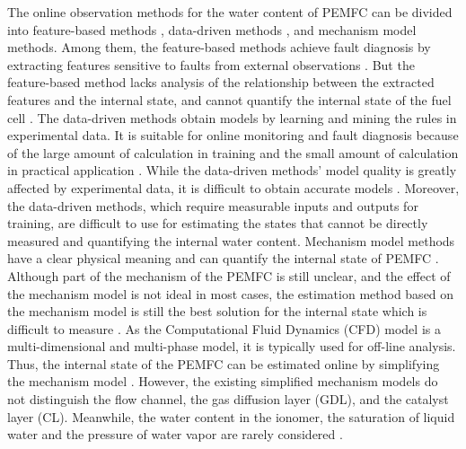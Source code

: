 The online observation methods for the water content of PEMFC can be divided into feature-based methods \cite{kimStateofhealthDiagnosisBased2012,maWaterContentDiagnosis2020,xuNonlinearObservationInternal2017}, data-driven methods \cite{zhangIntelligentSimultaneousFault2019,baoModelingControlAir2006,zhangUnscentedKalmanFilter2020}, and mechanism model methods\cite{linReviewHydrogenFuel2019,benmounaFaultDiagnosisMethods2017}. Among them, the feature-based methods achieve fault diagnosis by extracting features sensitive to faults from external observations \cite{zhangUnscentedKalmanFilter2020}. But the feature-based method lacks analysis of the relationship between the extracted features and the internal state, and cannot quantify the internal state of the fuel cell \cite{damourPolymerElectrolyteMembrane2015}. The data-driven methods obtain models by learning and mining the rules in experimental data. It is suitable for online monitoring and fault diagnosis because of the large amount of calculation in training and the small amount of calculation in practical application \cite{shinOnlineWaterContents2020,vichardHybridFuelCell2021,cooperElectricalTestMethods2006}. While the data-driven methods' model quality is greatly affected by experimental data, it is difficult to obtain accurate models \cite{benaggouneDatadrivenMethodMultistepahead2022,liDatadrivenFrameworkPerformance2022,liMultiobjectiveOptimizationDataDriven2021}. Moreover, the data-driven methods, which require measurable inputs and outputs for training, are difficult to use for estimating the states that cannot be directly measured and quantifying the internal water content\cite{meraghniDatadrivenDigitaltwinPrognostics2021}. Mechanism model methods have a clear physical meaning and can quantify the internal state of PEMFC \cite{yangInplaneTransportEffects2012}. Although part of the mechanism of the PEMFC is still unclear, and the effect of the mechanism model is not ideal in most cases, the estimation method based on the mechanism model is still the best solution for the internal state which is difficult to measure \cite{benmounaFaultDiagnosisMethods2017,liInvestigationMeasurementUncertainty2024,fullerWaterThermalManagement1993}. As the Computational Fluid Dynamics (CFD) model is a multi-dimensional and multi-phase model, it is typically used for off-line analysis. Thus, the internal state of the PEMFC can be estimated online by simplifying the mechanism model \cite{baoTwodimensionalModelingPolymer2015,baoTwodimensionalModelingPolymer2015,baoTwodimensionalModelingPolymer2015a}. However, the existing simplified mechanism models do not distinguish the flow channel, the gas diffusion layer (GDL), and the catalyst layer (CL). Meanwhile, the water content in the ionomer, the saturation of liquid water and the pressure of water vapor are rarely considered \cite{hinatsuWaterUptakePerfluorosulfonic1994}.

